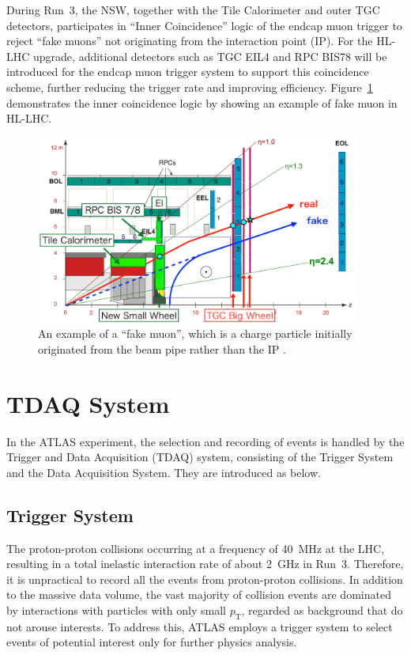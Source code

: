 During Run~3, the NSW, together with the Tile Calorimeter and outer TGC detectors, participates in ``Inner Coincidence'' logic of the endcap muon trigger to reject ``fake muons'' not originating from the interaction point (IP). For the HL-LHC upgrade, additional detectors such as TGC EIL4 and RPC BIS78 will be introduced for the endcap muon trigger system to support this coincidence scheme, further reducing the trigger rate and improving efficiency. Figure~\ref{fig:InnerCoin} demonstrates the inner coincidence logic by showing an example of fake muon in HL-LHC.

\begin{figure}[htbp]
  \centering
  \includegraphics[width=0.95\textwidth]{figs/chapter2/InnerCoin_new2.png}
  \caption{An example of a ``fake muon'', which is a charge particle initially originated from the beam pipe rather than the IP \cite{InnerCoinPoster}.}
  \label{fig:InnerCoin}
\end{figure}

\section{TDAQ System} \label{sec:TDAQSystem}
In the ATLAS experiment, the selection and recording of events is handled by the Trigger and Data Acquisition (TDAQ) system, consisting of the Trigger System and the Data Acquisition System. They are introduced as below.
\subsection{Trigger System}
The proton-proton collisions occurring at a frequency of 40~MHz at the LHC, resulting in a total inelastic interaction rate of about 2~GHz in Run~3. Therefore, it is unpractical to record all the events from proton-proton collisions. In addition to the massive data volume, the vast majority of collision events are dominated by interactions with particles with only small $p_{\mathrm{T}}$, regarded as background that do not arouse interests. To address this, ATLAS employs a trigger system to select events of potential interest only for further physics analysis.

